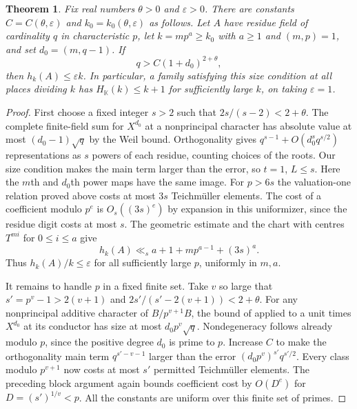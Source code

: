 \documentclass[11pt,letterpaper]{article}
\newtheorem{theorem}{Theorem}[section]
\theoremstyle{definition}
\numberwithin{equation}{section}
\begin{document}
\begin{theorem}\label{thm:hlargeimage}
Fix real numbers $\theta>0$ and $\varepsilon>0$. There are constants
$C=C(\theta,\varepsilon)$ and $k_0=k_0(\theta,\varepsilon)$ as follows.
Let $A$ have residue field of cardinality $q$ in characteristic $p$,
let $k=mp^a\ge k_0$ with $a\ge1$ and $(m,p)=1$, and set
$d_0=(m,q-1)$. If
\[
                          q>C(1+d_0)^{2+\theta},
\]
then $h_k(A)\le\varepsilon k$. In particular, a family satisfying
this size condition at all places dividing $k$ has
$H_{\mathbb K}(k)\le k+1$ for sufficiently large $k$, on taking
$\varepsilon=1$.
\end{theorem}
\begin{proof}
First choose a fixed integer $s>2$ such that
$2s/(s-2)<2+\theta$. The complete finite-field sum for $X^{d_0}$
at a nonprincipal character has absolute value at most
$(d_0-1)\sqrt q$ by the Weil bound. Orthogonality gives
$q^{s-1}+O(d_0^s q^{s/2})$ representations as $s$ powers of
each residue, counting choices of the roots. Our size condition
makes the main term larger than the error, so $t=1$, $L\le s$.
Here the $m$th and $d_0$th power maps have the same image.
For $p>6s$ the valuation-one relation proved above costs at most
$3s$ Teichm\"uller elements. The cost of a coefficient modulo $p^e$
is $O_s((3s)^e)$ by expansion in this uniformizer, since the
residue digit costs at most $s$. The geometric estimate and the
chart with centres $T^{mi}$ for $0\le i\le a$ give
\[
               h_k(A)\ll_s a+1+mp^{a-1}+(3s)^a.
\]
Thus $h_k(A)/k\le\varepsilon$ for all sufficiently large $p$,
uniformly in $m,a$.

It remains to handle $p$ in a fixed finite set. Take $v$ so large
that $s'=p^v-1>2(v+1)$ and $2s'/(s'-2(v+1))<2+\theta$.
For any nonprincipal additive character of $B/p^{v+1}B$, the bound
of \cite{hkhc} applied to a unit times $X^{d_0}$ at its conductor
has size at most $d_0p^v\sqrt q$. Nondegeneracy follows already
modulo $p$, since the positive degree $d_0$ is prime to $p$.
Increase $C$ to make the orthogonality main term $q^{s'-v-1}$
larger than the error $(d_0p^v)^{s'}q^{s'/2}$.
Every class modulo $p^{v+1}$ now costs at most $s'$ permitted
Teichm\"uller elements. The preceding block argument again bounds
coefficient cost by $O(D^e)$ for $D=(s')^{1/v}<p$. All the constants
are uniform over this finite set of primes.


\end{proof}
\end{document}
